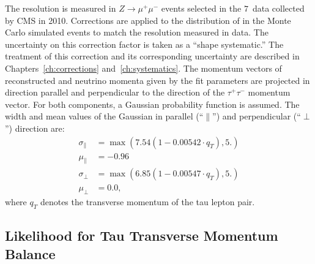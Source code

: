 The \MET resolution is measured in $Z \to \mu^{+} \mu^{-}$ events selected in
the $7$~\TeV data collected by CMS in 2010.  Corrections are applied to the
distribution of \MET in the Monte Carlo simulated events to match the resolution
measured in data.  The uncertainty on this correction factor is taken as a
``shape systematic.''  The treatment of this correction and its corresponding
uncertainty are described in Chapters~\ref{ch:corrections}
and~\ref{ch:systematics}.  The momentum vectors of reconstructed \MET and
neutrino momenta given by the fit parameters are projected in direction parallel
and perpendicular to the direction of the $\tau^{+} \tau^{-}$ momentum vector.
For both components, a Gaussian probability function is assumed.  The width and
mean values of the Gaussian in parallel (``$\parallel$'') and perpendicular
(``$\perp$'') direction are:
\begin{align}
\sigma_\parallel &= \max \left( 7.54 \left( 1 - 0.00542 \cdot q_{T} \right), 5. \right) \nonumber\\
\mu_\parallel &= -0.96 \nonumber \\
\sigma_\perp &= \max \left( 6.85 \left( 1 - 0.00547 \cdot q_{T} \right), 5. \right) \nonumber \\
\mu_\perp &= 0.0, \nonumber
\end{align}
where $q_{T}$ denotes the transverse momentum of the tau lepton pair.


\subsection{Likelihood for Tau Transverse Momentum Balance}
\label{sec:ptBalance}

